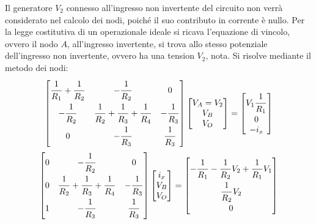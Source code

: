 \documentclass{article}
\begin{document}
Il generatore $V_2$ connesso all'ingresso non invertente del circuito non verrà considerato nel calcolo dei nodi, poiché il suo contributo in corrente è 
nullo. 
Per la legge costitutiva di un operazionale ideale si ricava l'equazione di vincolo, ovvero il nodo $A$, all'ingresso invertente, si trova allo 
stesso potenziale dell'ingresso non invertente, ovvero ha una tension $V_2$, nota. 
Si risolve mediante il metodo dei nodi:
\begin{gather*}
    \begin{bmatrix}
        \displaystyle\frac{\strut 1}{\strut R_1}+\frac{\strut 1}{\strut R_2}&-\displaystyle\frac{\strut 1}{\strut R_2}&0\\
        -\displaystyle\frac{\strut 1}{\strut R_2}&\displaystyle\frac{\strut 1}{\strut R_2}+\frac{\strut 1}{\strut R_3}+\frac{\strut 1}{\strut R_4}&-\displaystyle\frac{\strut 1}{\strut R_3}\\
        0&-\displaystyle\frac{\strut 1}{\strut R_3}&\displaystyle\frac{\strut 1}{\strut R_3}
    \end{bmatrix}\begin{bmatrix}
        V_A=V_2\\V_B\\V_O
    \end{bmatrix}=\begin{bmatrix}
        V_1\displaystyle\frac{\strut 1}{\strut R_1}\\0\\-i_x
    \end{bmatrix}\\
    \begin{bmatrix}
        0&-\displaystyle\frac{\strut 1}{\strut R_2}&0\\
        0&\displaystyle\frac{\strut 1}{\strut R_2}+\frac{\strut 1}{\strut R_3}+\frac{\strut 1}{\strut R_4}&-\displaystyle\frac{\strut 1}{\strut R_3}\\
        1&-\displaystyle\frac{\strut 1}{\strut R_3}&\displaystyle\frac{\strut 1}{\strut R_3}
    \end{bmatrix}\begin{bmatrix}
        i_x\\V_B\\V_O
    \end{bmatrix}=\begin{bmatrix}
        -\displaystyle\frac{\strut 1}{\strut R_1}-\frac{\strut 1}{\strut R_2}V_2+\frac{\strut 1}{\strut R_1}V_1\\
        \displaystyle\frac{\strut 1}{\strut R_2}V_2\\
        0
    \end{bmatrix}
\end{gather*}
\end{document}

